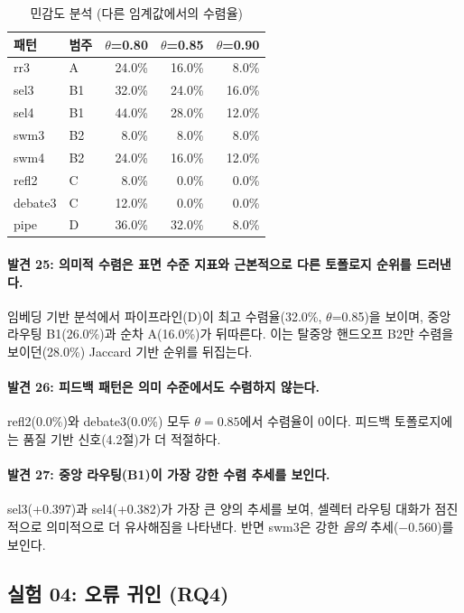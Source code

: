 \documentclass[a4paper,11pt]{article}
\begin{document}
\begin{table}[H]
\centering
\caption{민감도 분석 (다른 임계값에서의 수렴율)}
\label{tab:sensitivity-theta}
{\small
\begin{tabular}{llrrr}
\toprule
패턴 & 범주 & $\theta$=0.80 & $\theta$=0.85 & $\theta$=0.90 \\
\midrule
rr3     & A  & 24.0\% & 16.0\% & 8.0\% \\
sel3    & B1 & 32.0\% & 24.0\% & 16.0\% \\
sel4    & B1 & 44.0\% & 28.0\% & 12.0\% \\
swm3    & B2 & 8.0\%  & 8.0\%  & 8.0\% \\
swm4    & B2 & 24.0\% & 16.0\% & 12.0\% \\
refl2   & C  & 8.0\%  & 0.0\%  & 0.0\% \\
debate3 & C  & 12.0\% & 0.0\%  & 0.0\% \\
pipe    & D  & 36.0\% & 32.0\% & 8.0\% \\
\bottomrule
\end{tabular}
}
\end{table}

\paragraph{발견 25: 의미적 수렴은 표면 수준 지표와 근본적으로 다른 토폴로지 순위를 드러낸다.}
임베딩 기반 분석에서 파이프라인(D)이 최고 수렴율(32.0\%, $\theta$=0.85)을 보이며, 중앙 라우팅 B1(26.0\%)과 순차 A(16.0\%)가 뒤따른다. 이는 탈중앙 핸드오프 B2만 수렴을 보이던(28.0\%) Jaccard 기반 순위를 뒤집는다.

\paragraph{발견 26: 피드백 패턴은 의미 수준에서도 수렴하지 않는다.}
refl2(0.0\%)와 debate3(0.0\%) 모두 $\theta=0.85$에서 수렴율이 0이다. 피드백 토폴로지에는 품질 기반 신호(4.2절)가 더 적절하다.

\paragraph{발견 27: 중앙 라우팅(B1)이 가장 강한 수렴 추세를 보인다.}
sel3(+0.397)과 sel4(+0.382)가 가장 큰 양의 추세를 보여, 셀렉터 라우팅 대화가 점진적으로 의미적으로 더 유사해짐을 나타낸다. 반면 swm3은 강한 \emph{음의} 추세($-0.560$)를 보인다.

\subsection{실험 04: 오류 귀인 (RQ4)}
\label{sec:exp04}
\end{document}
